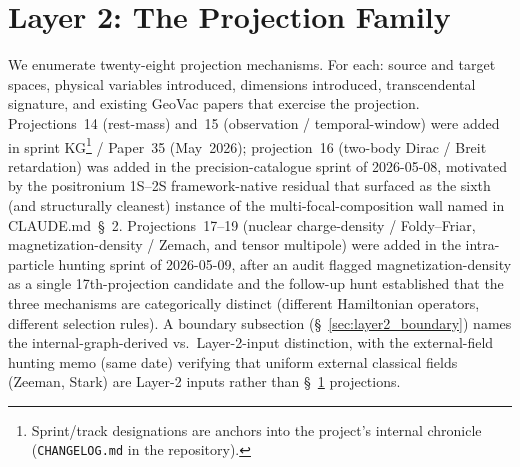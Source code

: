 \documentclass[11pt]{article}
\begin{document}
\section{Layer 2: The Projection Family}
\label{sec:layer2}

We enumerate twenty-eight projection mechanisms.  For each: source and
target spaces, physical variables introduced, dimensions
introduced, transcendental signature, and existing GeoVac papers
that exercise the projection.  Projections~14 (rest-mass) and~15
(observation / temporal-window) were added in sprint
KG\footnote{Sprint/track designations are anchors into the project's
internal chronicle (\texttt{CHANGELOG.md} in the repository).} /
Paper~35 (May~2026); projection~16 (two-body Dirac / Breit retardation) was
added in the precision-catalogue sprint of 2026-05-08, motivated by
the positronium 1S--2S framework-native residual that surfaced as
the sixth (and structurally cleanest) instance of the
multi-focal-composition wall named in CLAUDE.md~\S~2.
Projections~17--19 (nuclear charge-density / Foldy--Friar,
magnetization-density / Zemach, and tensor multipole) were added in
the intra-particle hunting sprint of 2026-05-09, after an audit
flagged
magnetization-density as a single 17th-projection candidate and the
follow-up hunt established that the three mechanisms are
categorically distinct (different Hamiltonian operators, different
selection rules).  A boundary
subsection (\S~\ref{sec:layer2_boundary}) names the
internal-graph-derived vs.\ Layer-2-input distinction, with the
external-field hunting memo
(same date)
verifying that uniform external classical fields (Zeeman, Stark) are
Layer-2 inputs rather than \S~\ref{sec:layer2} projections.
\end{document}
